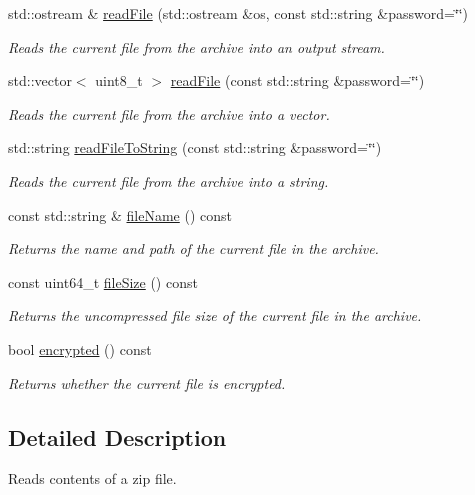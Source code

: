 \begin{DoxyCompactItemize}
std\+::ostream \& \hyperlink{group___utility_module_ga2139dc65cb701db211a8fe4970232307}{read\+File} (std\+::ostream \&os, const std\+::string \&password=\char`\"{}\char`\"{})
\begin{DoxyCompactList}\small\item\em Reads the current file from the archive into an output stream. \end{DoxyCompactList}\item 
std\+::vector$<$ uint8\+\_\+t $>$ \hyperlink{group___utility_module_gaf6c3c8e93c73b827d8dcd06c7b0aa1f8}{read\+File} (const std\+::string \&password=\char`\"{}\char`\"{})
\begin{DoxyCompactList}\small\item\em Reads the current file from the archive into a vector. \end{DoxyCompactList}\item 
std\+::string \hyperlink{group___utility_module_gaff912e76c9566cf07f198acc2df1decc}{read\+File\+To\+String} (const std\+::string \&password=\char`\"{}\char`\"{})
\begin{DoxyCompactList}\small\item\em Reads the current file from the archive into a string. \end{DoxyCompactList}\item 
const std\+::string \& \hyperlink{group___utility_module_ga4c5433ff98fc88ebe244871a16660e0f}{file\+Name} () const 
\begin{DoxyCompactList}\small\item\em Returns the name and path of the current file in the archive. \end{DoxyCompactList}\item 
const uint64\+\_\+t \hyperlink{group___utility_module_ga447144b52bd10fb30c362d8b05f9547a}{file\+Size} () const 
\begin{DoxyCompactList}\small\item\em Returns the uncompressed file size of the current file in the archive. \end{DoxyCompactList}\item 
bool \hyperlink{group___utility_module_gafd884d3fc036bfe37ec3e4e4c272d466}{encrypted} () const 
\begin{DoxyCompactList}\small\item\em Returns whether the current file is encrypted. \end{DoxyCompactList}\end{DoxyCompactItemize}


\subsection{Detailed Description}
Reads contents of a zip file. 

